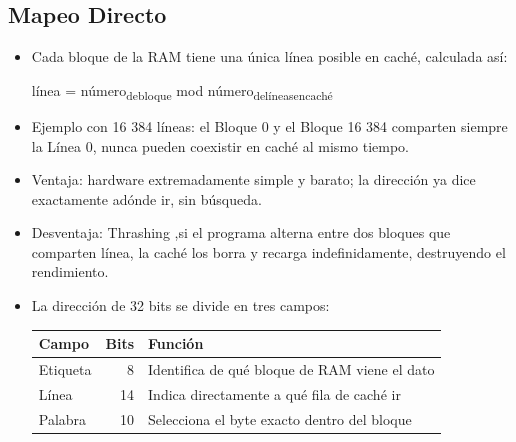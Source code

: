\documentclass{article}
\begin{document}
\subsection{Mapeo Directo}
\label{sec:orgbe0747b}
\begin{itemize}
\item Cada bloque de la RAM tiene una única línea posible en caché, calculada así:

\alert{línea = número\textsubscript{de}\textsubscript{bloque} mod número\textsubscript{de}\textsubscript{líneas}\textsubscript{en}\textsubscript{caché}}

\item Ejemplo con 16 384 líneas: el Bloque 0 y el Bloque 16 384 comparten
siempre la Línea 0, nunca pueden coexistir en caché al mismo tiempo.
\item \alert{Ventaja}: hardware extremadamente simple y barato; la dirección ya
dice exactamente adónde ir, sin búsqueda.
\item \alert{Desventaja}: \alert{Thrashing} ,si el programa alterna entre dos bloques
que comparten línea, la caché los borra y recarga indefinidamente,
destruyendo el rendimiento.
\item La dirección de 32 bits se divide en tres campos:
\begin{center}
\begin{tabular}{lrl}
Campo & Bits & Función\\[0pt]
\hline
Etiqueta & 8 & Identifica de qué bloque de RAM viene el dato\\[0pt]
Línea & 14 & Indica directamente a qué fila de caché ir\\[0pt]
Palabra & 10 & Selecciona el byte exacto dentro del bloque\\[0pt]
\end{tabular}
\end{center}
\end{itemize}
\end{document}
